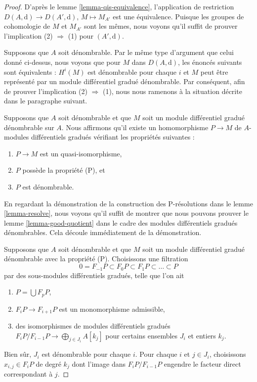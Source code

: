 \begin{proof}
\medskip\noindent
D'après le lemme
\ref{lemma-qis-equivalence}, l'application de restriction $D(A, \text{d}) \to D(A',
\text{d})$, $M \mapsto M_{A'}$ est une équivalence. Puisque les
groupes de cohomologie de $M$ et $M_{A'}$ sont les mêmes, nous voyons
qu'il suffit de prouver l'implication (2) $\Rightarrow$ (1)
pour $(A', \text{d})$.

\medskip\noindent
Supposons que $A$ soit dénombrable. Par le même type d'argument que celui
donné ci-dessus, nous voyons que pour $M$ dans $D(A,
\text{d})$, les énoncés suivants sont équivalents : $H^i(M)$ est dénombrable pour
chaque $i$ et $M$ peut être représenté par un module différentiel gradué dénombrable.
Par conséquent, afin de prouver l'implication (2) $\Rightarrow$ (1),
nous nous ramenons à la situation décrite dans le paragraphe suivant.

\medskip\noindent
Supposons que $A$ soit dénombrable et que $M$ soit un module différentiel gradué
dénombrable sur $A$. Nous affirmons qu'il existe un homomorphisme $P \to M$ de
$A$-modules différentiels gradués vérifiant les propriétés suivantes :
\begin{enumerate}
\item $P \to M$ est un quasi-isomorphisme,
\item $P$ possède la propriété (P), et
\item $P$ est dénombrable.
\end{enumerate}
En regardant la démonstration de la construction des P-résolutions dans
le lemme \ref{lemma-resolve}, nous voyons qu'il suffit de montrer que nous
pouvons prouver le lemme \ref{lemma-good-quotient}
dans le cadre des modules différentiels gradués dénombrables. Cela
découle immédiatement de la démonstration.

\medskip\noindent
Supposons que $A$ soit dénombrable et que $M$ soit un module
différentiel gradué dénombrable avec la propriété (P). Choisissons une filtration
$$
0 = F_{-1}P \subset F_0P \subset F_1P \subset \ldots \subset P
$$
par des sous-modules différentiels gradués, telle que l'on ait
\begin{enumerate}
\item $P = \bigcup F_pP$,
\item $F_iP \to F_{i + 1}P$ est un monomorphisme admissible,
\item des isomorphismes de modules différentiels
gradués $F_iP/F_{i - 1}P \to \bigoplus_{j \in J_i} A[k_j]$ pour
certains ensembles $J_i$ et entiers $k_j$.
\end{enumerate}
Bien sûr, $J_i$ est dénombrable pour chaque $i$. Pour chaque $i$
et $j \in J_i$, choisissons $x_{i, j} \in F_iP$ de degré $k_j$ dont
l'image dans $F_iP/F_{i - 1}P$ engendre le facteur direct correspondant
à $j$.


\end{proof}
